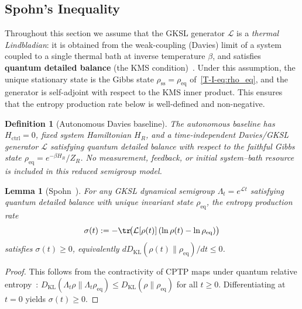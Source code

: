 \documentclass[12pt,a4paper,openany]{book}
\newtheorem{lemma}[theorem]{Lemma}
\newtheorem{definition}[theorem]{Definition}
\begin{document}
\subsection{Spohn's Inequality}

Throughout this section we assume that the GKSL generator
$\mathcal{L}$ is a \emph{thermal Lindbladian}: it is obtained
from the weak-coupling (Davies) limit of a system coupled to a
single thermal bath at inverse temperature $\beta$, and satisfies
\textbf{quantum detailed balance} (the KMS
condition)~\cite{Spohn1978,BreuerPetruccione2002}.
Under this assumption, the unique stationary state is the Gibbs
state $\rho_{\mathrm{ss}} = \rho_{\mathrm{eq}}$
of~\eqref{T-I-eq:rho_eq}, and the generator is self-adjoint with
respect to the KMS inner product.
This ensures that the entropy production rate below is
well-defined and non-negative.

\begin{definition}[Autonomous Davies baseline]
\label{T-I-def:autonomous_davies}
The autonomous baseline has $H_{\mathrm{ctrl}}=0$, fixed system
Hamiltonian $H_R$, and a time-independent Davies/GKSL generator
$\mathcal L$ satisfying quantum detailed balance with respect to the
faithful Gibbs state $\rho_{\mathrm{eq}}=e^{-\beta H_R}/Z_R$.
No measurement, feedback, or initial system--bath resource is included
in this reduced semigroup model.
\end{definition}

\begin{lemma}[Spohn~\cite{Spohn1978}]
\label{T-I-lem:spohn}
For any GKSL dynamical semigroup $\Lambda_t = e^{\mathcal{L}t}$
satisfying quantum detailed balance with unique invariant state
$\rho_{\mathrm{eq}}$, the entropy production
rate
\begin{equation}
\label{T-I-eq:spohn_sigma}
\sigma(t) := -\tr\!\bigl(\mathcal{L}[\rho(t)]\,
(\ln\rho(t) - \ln\rho_{\mathrm{eq}})\bigr)
\end{equation}
satisfies $\sigma(t) \geq 0$, equivalently
$dD_{\mathrm{KL}}(\rho(t)\|\rho_{\mathrm{eq}})/dt\leq0$.
\end{lemma}

\begin{proof}
This follows from the contractivity of CPTP maps under quantum
relative entropy~\cite{Spohn1978,BreuerPetruccione2002}:
$D_{\mathrm{KL}}(\Lambda_t\rho \| \Lambda_t\rho_{\mathrm{eq}})
\leq D_{\mathrm{KL}}(\rho \| \rho_{\mathrm{eq}})$
for all $t \geq 0$.
Differentiating at $t = 0$ yields $\sigma(t) \geq 0$.
\end{proof}
\end{document}
